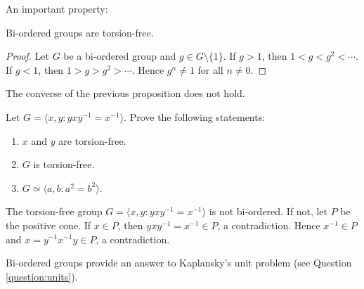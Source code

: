 \begin{graybox}
An important property:

\begin{proposition}
	\label{pro:BOsintorsion}
	Bi-ordered groups are torsion-free.
\end{proposition}

\begin{proof}
	Let $G$ be a bi-ordered group and $g\in G\setminus\{1\}$. 
	If $g>1$, then
	$1<g<g^2<\cdots$. If $g<1$, then $1>g>g^2>\cdots$. Hence $g^n\ne 1$ 
	for all $n\ne 0$. 
\end{proof}

The converse of the previous proposition does not hold. 

\begin{xca}
Let $G=\langle x,y:yxy^{-1}=x^{-1}\rangle$. Prove the following statements: 
\begin{enumerate}
    \item $x$ and $y$ are torsion-free. 
    \item $G$ is torsion-free. 
    \item $G\simeq \langle a,b:a^2=b^2\rangle$.
\end{enumerate}
\end{xca}



\begin{example}
	The torsion-free group $G=\langle x,y:yxy^{-1}=x^{-1}\rangle$ is not bi-ordered. 
	If not, let $P$ 
	be the positive cone. If $x\in P$, 
	then $yxy^{-1}=x^{-1}\in P$, a contradiction. Hence $x^{-1}\in P$
	and $x=y^{-1}x^{-1}y\in P$, a contradiction.
\end{example}

Bi-ordered groups provide 
an answer to Kaplansky's unit problem (see Question \ref{question:units}).


\end{graybox}
